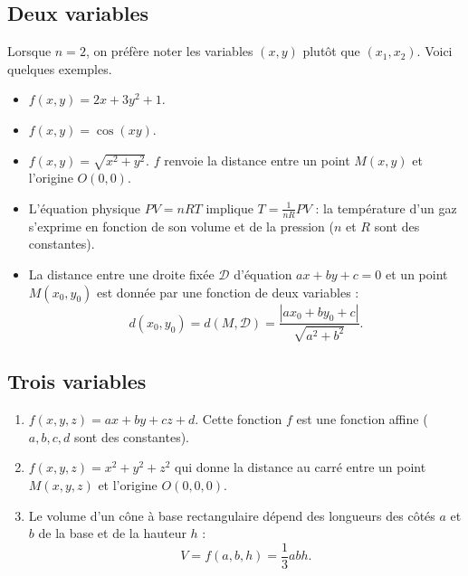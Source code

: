 \subsection{Deux variables}

Lorsque $n=2$, on préfère noter les variables $(x,y)$ plutôt que $(x_1,x_2)$.
Voici quelques exemples.
\begin{exemple}{}{}
	
	\begin{itemize}
		\item $f(x,y) = 2x+3y^2+1$.
		\item $f(x,y) = \cos(xy)$.
		\item $f(x,y) = \sqrt{x^2+y^2}$. $f$ renvoie la distance entre un point $M(x,y)$ et l'origine $O(0,0)$.
		
		
		\item L'équation physique $PV=nRT$ implique $T = \frac{1}{nR}PV$ :
		la température d'un gaz s'exprime en fonction de son volume et de la pression ($n$ et $R$ sont des constantes).
		\item La distance entre une droite fixée $\mathcal{D}$ d'équation $ax+by+c=0$ et un point $M(x_0,y_0)$ est donnée par une fonction de deux variables : $$d(x_0,y_0) = d(M,\mathcal{D}) = \frac{|ax_0+by_0+c|}{\sqrt{a^2+b^2}}.$$
		
		
		
	\end{itemize}
\end{exemple}


\subsection{Trois variables}

\begin{exemple}{}{}
	
	\begin{enumerate}
		\item $f(x,y,z) = ax+by+cz+d$. Cette fonction $f$ est une fonction affine ($a,b,c,d$ sont des constantes).
		\item $f(x,y,z) = x^2+y^2+z^2$ qui donne la distance au carré entre un point $M(x,y,z)$ et l'origine $O(0,0,0)$.
		\item Le volume d'un cône à base rectangulaire dépend des longueurs des côtés $a$ et $b$ de la base et de la hauteur $h$ :
		$$V = f(a,b,h) = \frac13 abh.$$
		
		
	\end{enumerate}
\end{exemple}


